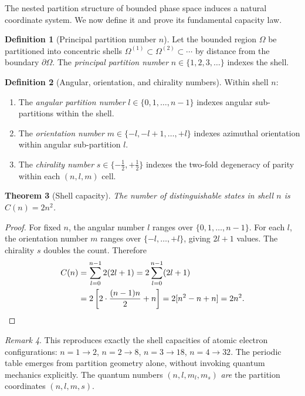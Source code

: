 \documentclass[10pt,twocolumn]{article}
\newtheorem{theorem}{Theorem}[section]
\theoremstyle{definition}
\newtheorem{definition}[theorem]{Definition}
\theoremstyle{remark}
\newtheorem{remark}[theorem]{Remark}
\begin{document}
The nested partition structure of bounded phase space induces a
natural coordinate system.  We now define it and prove its
fundamental capacity law.

\begin{definition}[Principal partition number $n$]
\label{def:principal}
Let the bounded region $\Omega$ be partitioned into concentric
shells $\Omega^{(1)}\subset\Omega^{(2)}\subset\cdots$ by
distance from the boundary $\partial\Omega$.  The \emph{principal
partition number} $n\in\{1,2,3,\dots\}$ indexes the shell.
\end{definition}

\begin{definition}[Angular, orientation, and chirality numbers]
\label{def:angular}
Within shell $n$:
\begin{enumerate}[leftmargin=*,itemsep=1pt]
\item The \emph{angular partition number}
  $l\in\{0,1,\dots,n-1\}$ indexes angular sub-partitions
  within the shell.
\item The \emph{orientation number}
  $m\in\{-l,-l+1,\dots,+l\}$ indexes azimuthal orientation
  within angular sub-partition $l$.
\item The \emph{chirality number} $s\in\{-\tfrac12,+\tfrac12\}$
  indexes the two-fold degeneracy of parity within each
  $(n,l,m)$ cell.
\end{enumerate}
\end{definition}

\begin{theorem}[Shell capacity]\label{thm:shell}
The number of distinguishable states in shell $n$ is
$C(n)=2n^2$.
\end{theorem}

\begin{proof}
For fixed $n$, the angular number $l$ ranges over
$\{0,1,\dots,n-1\}$.  For each $l$, the orientation number $m$
ranges over $\{-l,\dots,+l\}$, giving $2l+1$ values.  The
chirality $s$ doubles the count.  Therefore
\begin{align}
  C(n)
  &= \sum_{l=0}^{n-1}2(2l+1)
  = 2\sum_{l=0}^{n-1}(2l+1) \notag\\
  &= 2\left[2\cdot\frac{(n-1)n}{2}+ n\right]
  = 2[n^2-n+n] = 2n^2.
\label{eq:shell}
\end{align}
\end{proof}

\begin{remark}
This reproduces exactly the shell capacities of atomic
electron configurations: $n=1\to 2$, $n=2\to 8$, $n=3\to 18$,
$n=4\to 32$.  The periodic table emerges from partition
geometry alone, without invoking quantum mechanics explicitly.
The quantum numbers $(n,l,m_l,m_s)$ \emph{are} the partition
coordinates $(n,l,m,s)$.
\end{remark}
\end{document}
